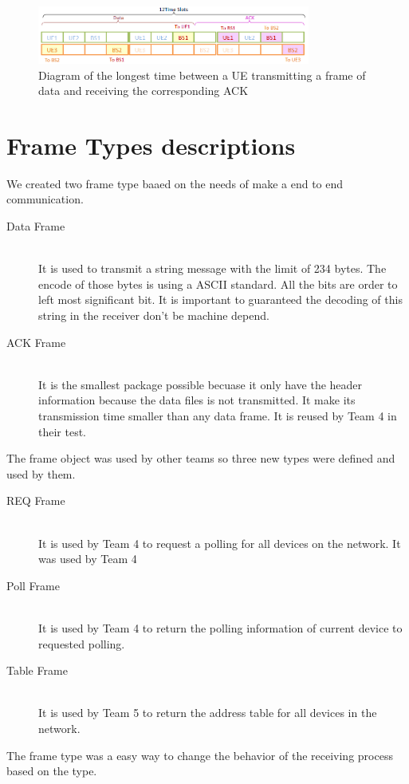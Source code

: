 \begin{figure}[ht]
    \centering
    \includegraphics[width=0.8\textwidth]{ACK_timeout_long.PNG}
    \caption{Diagram of the longest time between a UE transmitting a frame of data and receiving the corresponding ACK}
    \label{fig:ACKtimelong}
\end{figure}







\section{Frame Types descriptions}
We created two frame type baaed on the needs of make a end to end communication.

\begin{description}
  \item[Data Frame] \hfill \\
  It is used to transmit a string message with the limit of 234 bytes. The encode of those bytes is using a ASCII standard. All the bits are order to left most significant bit.
	It is important to guaranteed the decoding of this string in the receiver don’t be machine depend. 
	
  \item[ACK Frame] \hfill \\
  It is the smallest package possible becuase it only have the header information because the data files is not transmitted. It make its transmission time smaller than any data frame. It is reused by Team 4 in their test. 
\end{description}

The frame object was used by other teams so three new types were defined and used by them.
\begin{description}
  \item[REQ Frame] \hfill \\
It is used by Team 4 to request a polling for all devices on the network. It was used by Team 4
	
  \item[Poll Frame] \hfill \\
 It is used by Team 4 to return the polling information of current device to requested polling. 
  \item[Table Frame] \hfill \\
 It is used by Team 5 to return the address table for all devices in the network.

\end{description} 

The frame type was a easy way to change the behavior of the receiving process based on the type.  


